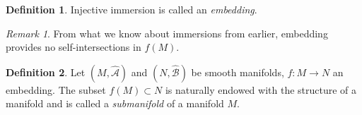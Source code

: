\documentclass[a4paper,11pt]{article}
\theoremstyle{theorem}
\theoremstyle{remark}
\newtheorem*{remark}{Remark}
\theoremstyle{definition}
\newtheorem{definition}{Definition}
\begin{document}
		\begin{definition}
			Injective immersion is called an \emph{embedding}.
		\end{definition}
	
		\begin{remark}
			From what we know about immersions from earlier, embedding provides no self-intersections in $f(M)$.
		\end{remark}
		
		\begin{definition}
			Let $(M, \hat{\mathcal A})$ and $(N, \hat{\mathcal B})$ be smooth manifolds, $f: M \to N$ an embedding. The subset $f(M) \subset N$ is naturally endowed with the structure of a manifold and is called a \emph{submanifold} of a manifold $M$.
		\end{definition}
	
	
	
\end{document}
